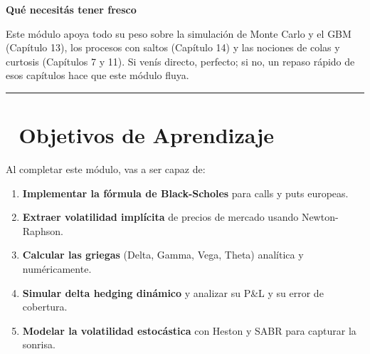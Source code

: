\documentclass[
  spanish,
  letterpaper,
  DIV=11,
  numbers=noendperiod]{scrreprt}
\providecommand{\tightlist}{%
  \setlength{\itemsep}{0pt}\setlength{\parskip}{0pt}}
\begin{document}
\begin{tcolorbox}[enhanced jigsaw, bottomrule=.15mm, colback=white, breakable, left=2mm, colframe=quarto-callout-note-color-frame, leftrule=.75mm, arc=.35mm, toprule=.15mm, rightrule=.15mm, opacityback=0]
\begin{minipage}[t]{5.5mm}
\textcolor{quarto-callout-note-color}{\faInfo}
\end{minipage}%
\begin{minipage}[t]{\textwidth - 5.5mm}

\vspace{-3mm}\textbf{Qué necesitás tener fresco}\vspace{3mm}

Este módulo apoya todo su peso sobre la simulación de Monte Carlo y el
GBM (Capítulo 13), los procesos con saltos (Capítulo 14) y las nociones
de colas y curtosis (Capítulos 7 y 11). Si venís directo, perfecto; si
no, un repaso rápido de esos capítulos hace que este módulo fluya.

\end{minipage}%
\end{tcolorbox}

\begin{center}\rule{0.5\linewidth}{0.5pt}\end{center}

\section*{🎯 Objetivos de Aprendizaje}\label{objetivos-de-aprendizaje-3}


Al completar este módulo, vas a ser capaz de:

\begin{enumerate}
\def\labelenumi{\arabic{enumi}.}
\tightlist
\item
  \textbf{Implementar la fórmula de Black-Scholes} para calls y puts
  europeas.
\item
  \textbf{Extraer volatilidad implícita} de precios de mercado usando
  Newton-Raphson.
\item
  \textbf{Calcular las griegas} (Delta, Gamma, Vega, Theta) analítica y
  numéricamente.
\item
  \textbf{Simular delta hedging dinámico} y analizar su P\&L y su error
  de cobertura.
\item
  \textbf{Modelar la volatilidad estocástica} con Heston y SABR para
  capturar la sonrisa.
\end{enumerate}
\end{document}
